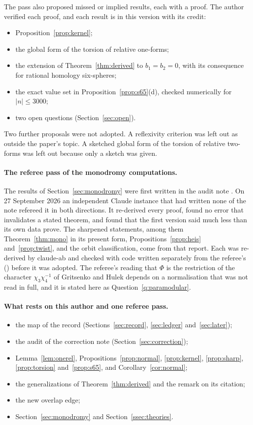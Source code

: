The pass also proposed missed or implied results, each with a proof. The author verified each proof, and each result is in this version with its credit:
\begin{itemize}
\item Proposition~\ref{prop:kernel};
\item the global form of the torsion of relative one-forms;
\item the extension of Theorem~\ref{thm:derived} to $b_1=b_2=0$, with its consequence for rational homology six-spheres;
\item the exact value set in Proposition~\ref{prop:s65}(d), checked numerically for $|n|\le3000$;
\item two open questions (Section~\ref{sec:open}).
\end{itemize}
Two further proposals were not adopted. A reflexivity criterion was left out as outside the paper's topic. A sketched global form of the torsion of relative two-forms was left out because only a sketch was given.

\paragraph{The referee pass of the monodromy computations.}
The results of Section~\ref{sec:monodromy} were first written in the audit note . On 27 September 2026 an independent Claude instance that had written none of the note refereed it in both directions. It re-derived every proof, found no error that invalidates a stated theorem, and found that the first version said much less than its own data prove. The sharpened statements, among them Theorem~\ref{thm:mono} in its present form, Propositions~\ref{prop:heis} and~\ref{prop:twist}, and the orbit classification, come from that report. Each was re-derived by claude-ab and checked with code written separately from the referee's () before it was adopted. The referee's reading that $\Phi$ is the restriction of the character $\chi_3\chi_4^{-1}$ of Gritsenko and Hulek depends on a normalisation that was not read in full, and it is stated here as Question~\ref{q:paramodular}.

\paragraph{What rests on this author and one referee pass.}
\begin{itemize}
\item the map of the record (Sections~\ref{sec:record}, \ref{sec:ledger} and~\ref{sec:later});
\item the audit of the correction note (Section~\ref{sec:correction});
\item Lemma~\ref{lem:onerel}, Propositions~\ref{prop:normal}, \ref{prop:kernel}, \ref{prop:sharp}, \ref{prop:torsion} and~\ref{prop:s65}, and Corollary~\ref{cor:normal};
\item the generalizations of Theorem~\ref{thm:derived} and the remark on its citation;
\item the new overlap edge;
\item Section~\ref{sec:monodromy} and Section~\ref{ssec:theories}.
\end{itemize}

